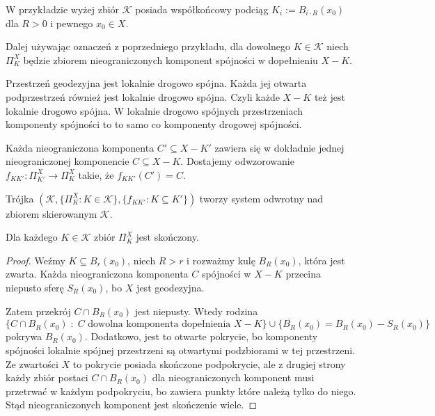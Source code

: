 \begin{example}[m]
  \item W przykładzie wyżej zbiór $\mathcal{K}$ posiada współkońcowy podciąg $K_i:=B_{i\cdot R}(x_0)$ dla $R>0$ i pewnego $x_0\in X$.
  \item Dalej używając oznaczeń z poprzedniego przykładu, dla dowolnego $K\in\mathcal{K}$ niech $\Pi_K^X$ będzie zbiorem nieograniczonych komponent spójności w dopełnieniu $X-K$.\medskip

    Przestrzeń geodezyjna jest lokalnie drogowo spójna. Każda jej otwarta podprzestrzeń również jest lokalnie drogowo spójna. Czyli każde $X-K$ też jest lokalnie drogowo spójna. W lokalnie drogowo spójnych przestrzeniach komponenty spójności to to samo co komponenty drogowej spójności.\medskip 

    Każda nieograniczona komponenta $C'\subseteq X-K'$ zawiera się w dokładnie jednej nieograniczonej komponencie $C\subseteq X-K$. Dostajemy odwzorowanie $f_{KK'}:\Pi_{K'}^X\to \Pi_K^X$ takie, że $f_{KK'}(C')=C$.\medskip
  
    Trójka $(\mathcal{K}, \{\Pi_K^X:K\in\mathcal{K}\}, \{f_{KK'}:K\subseteq K'\})$ tworzy system odwrotny nad zbiorem skierowanym $\mathcal{K}$.

    \begin{center}
    \end{center}

    \begin{fact}{}{}
      Dla każdego $K\in\mathcal{K}$ zbiór $\Pi_K^X$ jest skończony.
    \end{fact}

    \begin{proof}
      Weźmy $K\subseteq B_r(x_0)$, niech $R>r$ i rozważmy kulę $B_R(x_0)$, która jest zwarta. Każda nieograniczona komponenta $C$ spójności w $X-K$ przecina niepusto sferę $S_R(x_0)$, bo $X$ jest geodezyjna.

      Zatem przekrój $C\cap B_R(x_0)$ jest niepusty. Wtedy rodzina 
      $$\{C\cap B_R(x_0)\;:\;C\text{ dowolna komponenta dopełnienia }X-K\}\cup \{\overline{B_R}(x_0)=B_R(x_0)-S_R(x_0)\}$$
      pokrywa $B_R(x_0)$. Dodatkowo, jest to otwarte pokrycie, bo komponenty spójności lokalnie spójnej przestrzeni są otwartymi podzbiorami w tej przestrzeni. Ze zwartości $X$ to pokrycie posiada skończone podpokrycie, ale z drugiej strony każdy zbiór postaci $C\cap B_R(x_0)$ dla nieograniczonych komponent musi przetrwać w każdym podpokryciu, bo zawiera punkty które należą tylko do niego. Stąd nieograniczonych komponent jest skończenie wiele.
    \end{proof}
\end{example}

